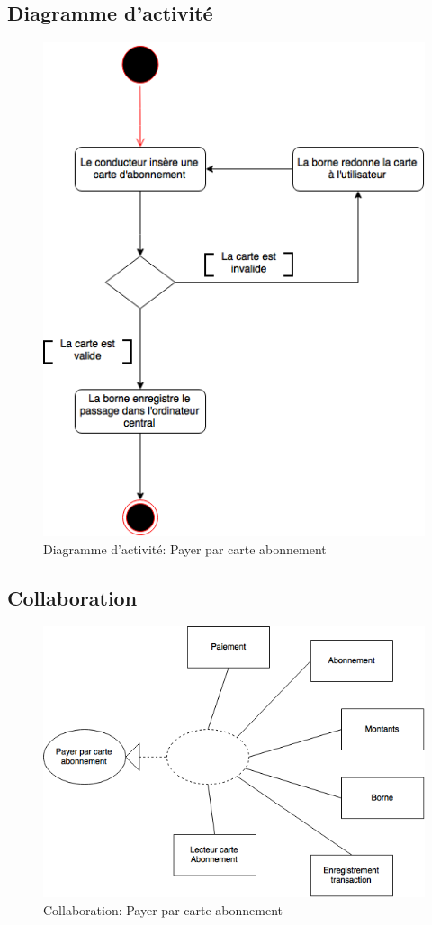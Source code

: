 \subsection{Diagramme d'activité}
\begin{figure}[h]
    \centering
    \includegraphics[scale=0.6]{02_Desenvolvimento/TD2/images/DAAbonnement.png}
    \caption{Diagramme d'activité: Payer par carte abonnement}
\end{figure}
\newpage
\subsection{Collaboration}
\begin{figure}[h]
    \centering
    \includegraphics[scale=0.6]{02_Desenvolvimento/TD2/images/ColaAbonnement.png}
    \caption{Collaboration: Payer par carte abonnement}
\end{figure}